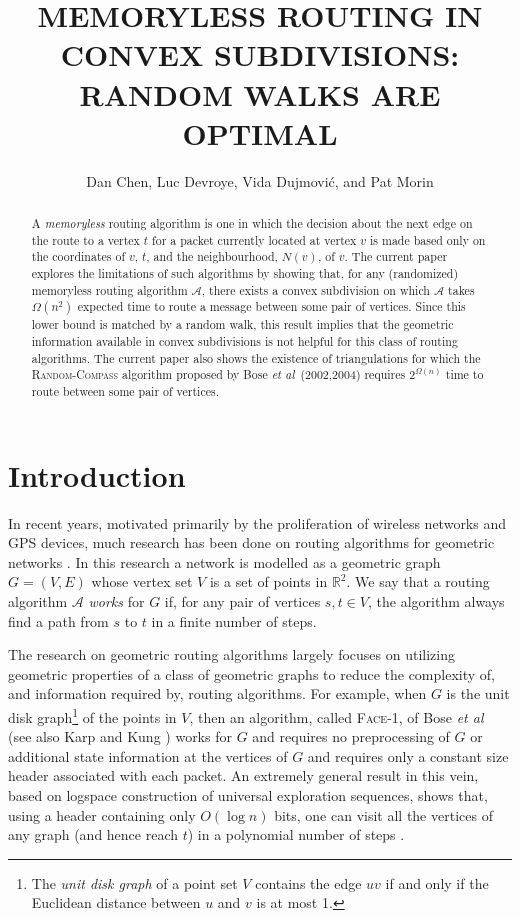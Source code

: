 \documentclass [letterpaper] {patmorin}
\title{\MakeUppercase{Memoryless Routing in Convex Subdivisions: \newline 
       Random Walks are Optimal}}
\author{Dan Chen, Luc Devroye, Vida Dujmovi\'c, and Pat Morin}
\newcommand{\R}{\mathbb{R}}
\newcommand{\etal}{\emph{et al}}
\begin{document}
\maketitle

\begin{abstract}
A \emph{memoryless} routing algorithm is one in which the decision
about the next edge on the route to a vertex $t$ for a packet currently
located at vertex $v$ is made based only on the coordinates of $v$, $t$,
and the neighbourhood, $N(v)$, of $v$.  The current paper explores the
limitations of such algorithms by showing that, for any (randomized)
memoryless routing algorithm $\mathcal{A}$, there exists a convex
subdivision on which $\mathcal{A}$ takes $\Omega(n^2)$ expected
time to route a message between some pair of vertices.  Since this
lower bound is matched by a random walk, this result implies that the
geometric information available in convex subdivisions is not helpful
for this class of routing algorithms.  The current paper also shows
the existence of triangulations for which the \textsc{Random-Compass}
algorithm proposed by Bose \etal\ (2002,2004) requires $2^{\Omega(n)}$
time to route between some pair of vertices.
\end{abstract}

\section{Introduction}
\label{sec:intro}

In recent years, motivated primarily by the proliferation of wireless networks and GPS devices, much research has been done on routing algorithms for geometric networks \cite{gior03}.  In this research a network is modelled as a geometric graph $G=(V,E)$ whose vertex set $V$ is a set of points in $\R^2$. We say that a routing algorithm $\mathcal{A}$ \emph{works} for $G$ if, for any pair of vertices $s,t\in V$, the algorithm always find a path from $s$ to $t$ in a finite number of steps.

The research on geometric routing algorithms largely focuses on utilizing geometric properties of a class of geometric graphs to reduce the complexity of, and information required by, routing algorithms.  For example, when $G$ is the unit disk graph\footnote{The \emph{unit disk graph} of a point set $V$ contains the edge $uv$ if and only if the Euclidean distance between $u$ and $v$ is at most 1.} of the points in $V$, then an algorithm, called \textsc{Face-1}, of Bose \etal\ \cite{bose01} (see also Karp and Kung \cite{kk00}) works for $G$ and requires no preprocessing of $G$ or additional state information at the vertices of $G$ and requires only a constant size header associated with each packet.  An extremely general result in this vein, based on logspace construction of universal exploration sequences, shows that, using a header containing only $O(\log n)$ bits, one can visit all the vertices of any graph (and hence reach $t$) in a polynomial number of steps \cite{b08}.
\end{document}
